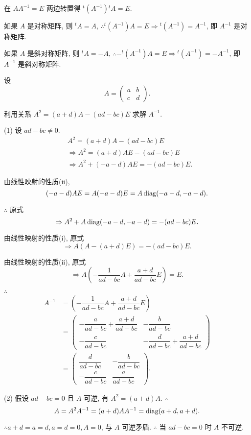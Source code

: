 \documentclass{ctexart}
\begin{document}
\begin{solution}
    在 $AA^{-1}=E$ 两边转置得 ${}^t(A^{-1}){}^tA=E$.

    如果 $A$ 是对称矩阵, 则 ${}^tA=A$, $\therefore{}^t(A^{-1})A=E\Rightarrow{}^t(A^{-1})=A^{-1}$, 即 $A^{-1}$ 是对称矩阵.

    如果 $A$ 是斜对称矩阵, 则 ${}^tA=-A$, $\therefore-{}^t(A^{-1})A=E\Rightarrow{}^t(A^{-1})=-A^{-1}$, 即 $A^{-1}$ 是斜对称矩阵.
\end{solution}
\setcounter{exercise}{13}
\begin{exercise}%
    设
    \[A=\begin{pmatrix}
        a & b \\
        c & d
    \end{pmatrix}.\]
    
    利用关系 $A^2=(a+d)A-(ad-bc)E$ 求解 $A^{-1}$.
\end{exercise}
\begin{solution}
    (1) 设 $ad-bc\neq0$.
    \begin{align*}
        & A^2=(a+d)A-(ad-bc)E \\
        & \Rightarrow A^2=(a+d)AE-(ad-bc)E \\
        & \Rightarrow A^2+(-a-d)AE=-(ad-bc)E.
    \end{align*}

    由线性映射的性质(ii),
    \[(-a-d)AE=A(-a-d)E=A\operatorname{diag}(-a-d,-a-d).\]

    $\therefore$ 原式
    \[\Rightarrow A^2+A\operatorname{diag}(-a-d,-a-d)=-(ad-bc)E.\]

    由线性映射的性质(i), 原式
    \[\Rightarrow A(A-(a+d)E)=-(ad-bc)E.\]

    由线性映射的性质(ii), 原式
    \[\Rightarrow A\left(-\dfrac{1}{ad-bc}A+\dfrac{a+d}{ad-bc}E\right)=E.\]

    $\therefore$
    \begin{align*}
        A^{-1} & =\left(-\dfrac{1}{ad-bc}A+\dfrac{a+d}{ad-bc}E\right) \\
        & =\begin{pmatrix}
            -\dfrac{a}{ad-bc}+\dfrac{a+d}{ad-bc} & -\dfrac{b}{ad-bc} \\[8pt]
            -\dfrac{c}{ad-bc} & -\dfrac{d}{ad-bc}+\dfrac{a+d}{ad-bc}
        \end{pmatrix} \\
        & =\begin{pmatrix}
            \dfrac{d}{ad-bc} & -\dfrac{b}{ad-bc} \\[8pt]
            -\dfrac{c}{ad-bc} & \dfrac{a}{ad-bc}
        \end{pmatrix}.
    \end{align*}

    (2) 假设 $ad-bc=0$ 且 $A$ 可逆, 有 $A^2=(a+d)A$. $\therefore$
    \[A=A^2A^{-1}=(a+d)AA^{-1}=\operatorname{diag}(a+d,a+d).\]

    $\therefore a+d=a=d,a=d=0,A=0$, 与 $A$ 可逆矛盾. $\therefore$ 当 $ad-bc=0$ 时 $A$ 不可逆.
\end{solution}
\end{document}
